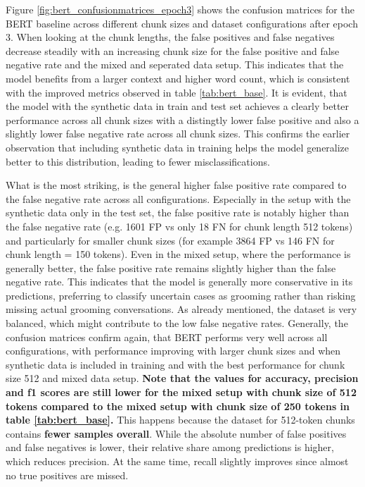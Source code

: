 Figure \ref{fig:bert_confusionmatrices_epoch3} shows the confusion matrices for the BERT baseline across different chunk sizes and dataset configurations after epoch 3. When looking at the chunk lengths, the false positives and false negatives decrease steadily with an increasing chunk size for the false positive and false negative rate and the mixed and seperated data setup. This indicates that the model benefits from a larger context and higher word count, which is consistent with the improved metrics observed in table \ref{tab:bert_base}. It is evident, that the model with the synthetic data in train and test set achieves a clearly better performance across all chunk sizes with a distingtly lower false positive and also a slightly lower false negative rate across all chunk sizes. This confirms the earlier observation that including synthetic data in training helps the model generalize better to this distribution, leading to fewer misclassifications. 

What is the most striking, is the general higher false positive rate compared to the false negative rate across all configurations. Especially in the setup with the synthetic data only in the test set, the false positive rate is notably higher than the false negative rate (e.g. 1601 FP vs only 18 FN for chunk length 512 tokens) and particularly for smaller chunk sizes (for example 3864 FP vs 146 FN for chunk length = 150 tokens). Even in the mixed setup, where the performance is generally better, the false positive rate remains slightly higher than the false negative rate. This indicates that the model is generally more conservative in its predictions, preferring to classify uncertain cases as grooming rather than risking missing actual grooming conversations.  As already mentioned, the dataset is very balanced, which might contribute to the low false negative rates. Generally, the confusion matrices confirm again, that BERT performs very well across all configurations, with performance improving with larger chunk sizes and when synthetic data is included in training and with the best performance for chunk size 512 and mixed data setup. \textbf{Note that the values for accuracy, precision and f1 scores are still lower for the mixed setup with chunk size of 512 tokens compared to the mixed setup with chunk size of 250 tokens in table \ref{tab:bert_base}.} This happens because the dataset for 512-token chunks contains \textbf{fewer samples overall}. While the absolute number of false positives and false negatives is lower, their relative share among predictions is higher, which reduces precision. At the same time, recall slightly improves since almost no true positives are missed.


